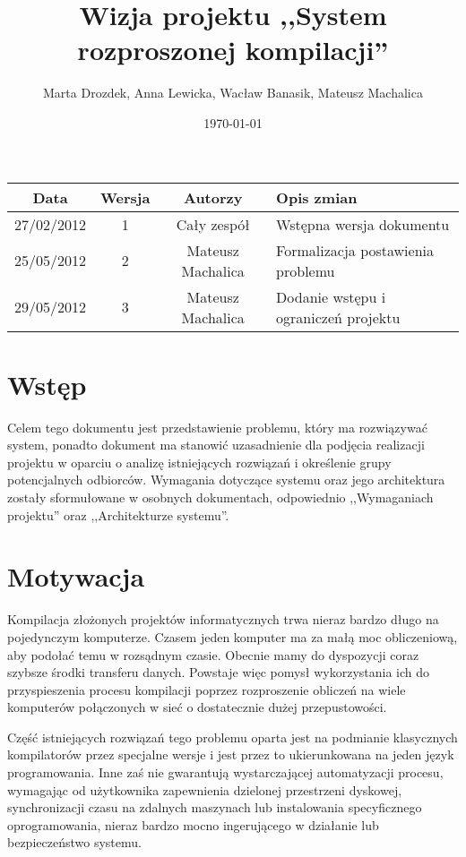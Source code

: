 \documentclass[a4paper]{article}
\title{Wizja projektu ,,System rozproszonej kompilacji''}
\author{Marta Drozdek, Anna Lewicka, Wacław Banasik, Mateusz Machalica}
\date{\today}
\begin{document}
\maketitle

\begin{table}[!h]
	\centering
	\begin{tabular}{|c|c|c|p{9cm}|}
		\hline
		\textbf{Data} & \textbf{Wersja} & \textbf{Autorzy} & \textbf{Opis zmian} \\ \hline
		27/02/2012 & 1 & Cały zespół & Wstępna wersja dokumentu \\ \hline
		25/05/2012 & 2 & Mateusz Machalica & Formalizacja postawienia problemu \\ \hline
		29/05/2012 & 3 & Mateusz Machalica & Dodanie wstępu i ograniczeń projektu \\ \hline
	\end{tabular}
\end{table}

\section{Wstęp}

Celem tego dokumentu jest przedstawienie problemu, który ma rozwiązywać system, ponadto dokument ma stanowić uzasadnienie dla podjęcia realizacji projektu w oparciu o analizę istniejących rozwiązań i określenie grupy potencjalnych odbiorców.
Wymagania dotyczące systemu oraz jego architektura zostały sformułowane w osobnych dokumentach, odpowiednio ,,Wymaganiach projektu'' oraz ,,Architekturze systemu''.

\section{Motywacja}

Kompilacja złożonych projektów informatycznych trwa nieraz bardzo długo na pojedynczym komputerze. Czasem jeden komputer ma za małą moc obliczeniową, aby podołać temu w rozsądnym czasie. Obecnie mamy do dyspozycji coraz szybsze środki transferu danych. Powstaje więc pomysł wykorzystania ich do przyspieszenia procesu kompilacji poprzez rozproszenie obliczeń na wiele komputerów połączonych w sieć o dostatecznie dużej przepustowości.

Część istniejących rozwiązań tego problemu oparta jest na podmianie klasycznych kompilatorów przez specjalne wersje i jest przez to ukierunkowana na jeden język programowania. Inne zaś nie gwarantują wystarczającej automatyzacji procesu, wymagając od użytkownika zapewnienia dzielonej przestrzeni dyskowej, synchronizacji czasu na zdalnych maszynach lub instalowania specyficznego oprogramowania, nieraz bardzo mocno ingerującego w działanie lub bezpieczeństwo systemu.
\end{document}
